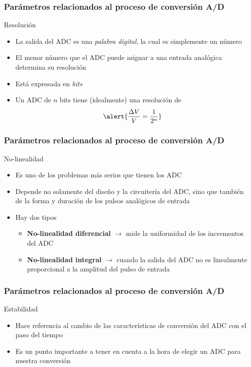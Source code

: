 \documentclass{beamer}
\begin{document}
\begin{frame}
\frametitle{Parámetros relacionados al proceso de conversión A/D}
\begin{block}{Resolución}
  	\begin{itemize}
    	\item La salida del ADC es una \alert{\textit{palabra digital}}, la cual
es simplemente un número 
    	\item {\color{blue} El menor número que el ADC puede asignar a una
entrada analógica determina su resolución} 
    	\item Está expresada en \textit{bits}
    	\item Un ADC de $n$ bits tiene (idealmente) una resolución de 
$$\alert{\frac{\Delta V}{V} = \frac{1}{2^n}}$$
  	\end{itemize}
\end{block}
\end{frame} 

\begin{frame}
\frametitle{Parámetros relacionados al proceso de conversión A/D}
\begin{block}{No-linealidad}
  	\begin{itemize}
    	\item Es uno de los problemas más serios que tienen los ADC
    	\item Depende no solamente del diseño y la circuitería del ADC, sino que
también de la forma y duración de los pulsos analógicos de entrada 
    	\item Hay dos tipos
    	\begin{itemize}
      	\item \textbf{No-linealidad diferencial} $\rightarrow$ mide la uniformidad de los
incrementos del ADC
      	\item \textbf{No-linealidad integral} $\rightarrow$ cuando la salida del ADC no
es linealmente proporcional a la amplitud del pulso de entrada 
    	\end{itemize}
  	\end{itemize}
\end{block}
\end{frame} 

\begin{frame}
\frametitle{Parámetros relacionados al proceso de conversión A/D}
\begin{block}{Estabilidad}
  	\begin{itemize}
    	\item Hace referencia al cambio de las características de conversión del
ADC con el paso del tiempo 
    	\item Es un punto importante a tener en cuenta a la hora de elegir un ADC
para nuestra conversión
  	\end{itemize}
\end{block}
\end{frame} 
\end{document}
